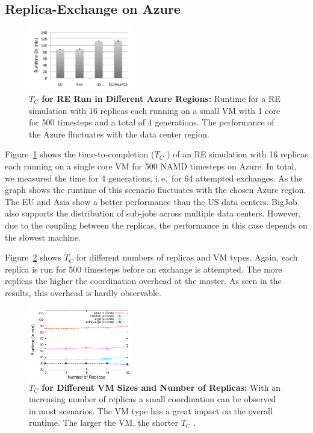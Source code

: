 \documentclass[conference,final]{IEEEtran}
\newcommand{\up}{\vspace*{-1em}}
\newcommand{\tc}{$T_{C}$ }
\newcommand{\jhanote}[1]{ {\textcolor{red} { ***SJ: #1 }}}
\newcommand{\jhanote}[1]{}
\begin{document}
\subsection{Replica-Exchange on Azure}

\begin{figure}[t]
    \centering
        \includegraphics[width=0.4\textwidth]{performance/repex_runtime_per_region.pdf}
        \up
        \caption{\textbf{\tc for RE Run in Different Azure Regions:}
          Runtime for a RE simulation with 16 replicas each running on
          a small VM with 1 core for 500 timesteps and a total of 4
          generations. The performance of the Azure fluctuates with
          the data center region.}
    \label{fig:performance_repex_runtime_per_region}
    \up
\end{figure}

Figure~\ref{fig:performance_repex_runtime_per_region} shows the
time-to-completion (\tc) of an RE simulation with 16 replicas each
running on a single core VM for 500 NAMD timesteps on Azure. In total,
we measured the time for 4 generations, i.\,e.\ for 64 attempted
exchanges. As the graph shows the runtime of this scenario fluctuates
with the chosen Azure region. The EU and Asia show a better
performance than the US data centers. BigJob also supports the
distribution of sub-jobs across multiple data centers. However, due to
the coupling between the replicas, the performance in this case
depends on the slowest machine.

Figure~\ref{fig:performance_repex_scaleout_vmsizes} shows \tc
for different numbers of replicas and VM types. 
Again, each replica is run for 500 timesteps before an exchange
is attempted. The more replicas the higher the coordination overhead
at the master. As seen in the results, this overhead is hardly
observable.
\begin{figure}[ht]
    \centering
        \includegraphics[width=0.4\textwidth]{performance/repex-azure.pdf}
    \caption{\textbf{\tc for Different VM Sizes and Number of Replicas:} With
    an increasing number of replicas a small coordination can be observed in most 
    scenarios. The VM type has a great impact on the overall runtime. The larger
    the VM, the shorter \tc. }
    \label{fig:performance_repex_scaleout_vmsizes}
    \up
\end{figure}
\end{document}
